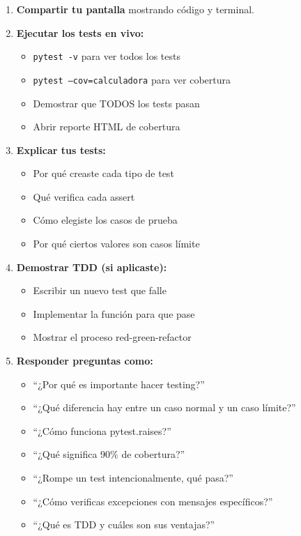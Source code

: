 \documentclass[12pt,a4paper]{article}
\begin{document}
\begin{enumerate}[leftmargin=*]
    \item \textbf{Compartir tu pantalla} mostrando código y terminal.
    
    \item \textbf{Ejecutar los tests en vivo:}
    \begin{itemize}
        \item \texttt{pytest -v} para ver todos los tests
        \item \texttt{pytest --cov=calculadora} para ver cobertura
        \item Demostrar que TODOS los tests pasan
        \item Abrir reporte HTML de cobertura
    \end{itemize}
    
    \item \textbf{Explicar tus tests:}
    \begin{itemize}
        \item Por qué creaste cada tipo de test
        \item Qué verifica cada assert
        \item Cómo elegiste los casos de prueba
        \item Por qué ciertos valores son casos límite
    \end{itemize}
    
    \item \textbf{Demostrar TDD (si aplicaste):}
    \begin{itemize}
        \item Escribir un nuevo test que falle
        \item Implementar la función para que pase
        \item Mostrar el proceso red-green-refactor
    \end{itemize}
    
    \item \textbf{Responder preguntas como:}
    \begin{itemize}
        \item ``¿Por qué es importante hacer testing?''
        \item ``¿Qué diferencia hay entre un caso normal y un caso límite?''
        \item ``¿Cómo funciona pytest.raises?''
        \item ``¿Qué significa 90\% de cobertura?''
        \item ``¿Rompe un test intencionalmente, qué pasa?''
        \item ``¿Cómo verificas excepciones con mensajes específicos?''
        \item ``¿Qué es TDD y cuáles son sus ventajas?''
    \end{itemize}
    

\end{enumerate}
\end{document}
